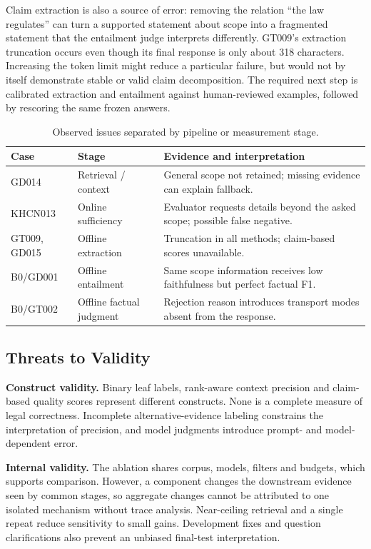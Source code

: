 Claim extraction is also a source of error: removing the relation ``the law regulates'' can turn a supported statement about scope into a fragmented statement that the entailment judge interprets differently. GT009's extraction truncation occurs even though its final response is only about 318 characters. Increasing the token limit might reduce a particular failure, but would not by itself demonstrate stable or valid claim decomposition. The required next step is calibrated extraction and entailment against human-reviewed examples, followed by rescoring the same frozen answers.

\begin{table}[H]\centering\small
\caption{Observed issues separated by pipeline or measurement stage.}\label{tab:issues}
\begin{tabularx}{\textwidth}{P{2.3cm}P{3cm}Y}\toprule
\textbf{Case} & \textbf{Stage} & \textbf{Evidence and interpretation}\\\midrule
GD014 & Retrieval / context & General scope not retained; missing evidence can explain fallback.\\
KHCN013 & Online sufficiency & Evaluator requests details beyond the asked scope; possible false negative.\\
GT009, GD015 & Offline extraction & Truncation in all methods; claim-based scores unavailable.\\
B0/GD001 & Offline entailment & Same scope information receives low faithfulness but perfect factual F1.\\
B0/GT002 & Offline factual judgment & Rejection reason introduces transport modes absent from the response.\\\bottomrule
\end{tabularx}
\end{table}

\subsection{Threats to Validity}
\textbf{Construct validity.} Binary leaf labels, rank-aware context precision and claim-based quality scores represent different constructs. None is a complete measure of legal correctness. Incomplete alternative-evidence labeling constrains the interpretation of precision, and model judgments introduce prompt- and model-dependent error.

\textbf{Internal validity.} The ablation shares corpus, models, filters and budgets, which supports comparison. However, a component changes the downstream evidence seen by common stages, so aggregate changes cannot be attributed to one isolated mechanism without trace analysis. Near-ceiling retrieval and a single repeat reduce sensitivity to small gains. Development fixes and question clarifications also prevent an unbiased final-test interpretation.

